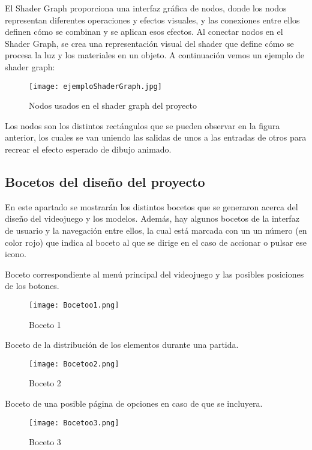 El Shader Graph proporciona una interfaz gráfica de nodos, donde los nodos representan diferentes operaciones y efectos visuales, y las conexiones entre ellos definen cómo se combinan y se aplican esos efectos. Al conectar nodos en el Shader Graph, se crea una representación visual del shader que define cómo se procesa la luz y los materiales en un objeto. A continuación vemos un ejemplo de shader graph:

\begin{figure}[H]
    \centering
    \texttt{[image: ejemploShaderGraph.jpg]}
    \caption{Nodos usados en el shader graph del proyecto}
\end{figure}

Los nodos son los distintos rectángulos que se pueden observar en la figura anterior, los cuales se van uniendo las salidas de unos a las entradas de otros para recrear el efecto esperado de dibujo animado.

\subsection{Bocetos del diseño del proyecto}

En este apartado se mostrarán los distintos bocetos que se generaron acerca del diseño del videojuego y los modelos. Además, hay algunos bocetos de la interfaz de usuario y la navegación entre ellos, la cual está marcada con un un número (en color rojo) que indica al boceto al que se dirige en el caso de accionar o pulsar ese icono.

Boceto correspondiente al menú principal del videojuego y las posibles posiciones de los botones.

\begin{figure}[H]
    \centering
    \texttt{[image: Bocetoo1.png]}
    \caption{Boceto 1}
\end{figure}

Boceto de la distribución de los elementos durante una partida.

\begin{figure}[H]
    \centering
    \texttt{[image: Bocetoo2.png]}
    \caption{Boceto 2}
\end{figure}

Boceto de una posible página de opciones en caso de que se incluyera.

\begin{figure}[H]
    \centering
    \texttt{[image: Bocetoo3.png]}
    \caption{Boceto 3}
\end{figure}

